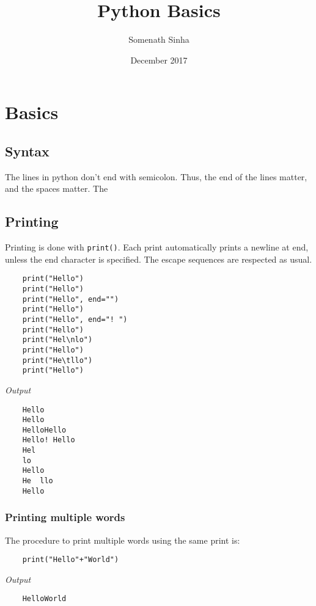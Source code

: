 \documentclass{report}
\title{Python Basics}
\author{Somenath Sinha}
\date{December 2017}
\begin{document}
	\maketitle
	\tableofcontents
	\chapter{Basics}
	\section{Syntax}
	The lines in python don't end with semicolon. Thus, the end of the lines matter, and the spaces matter. The 
	\section{Printing}
	
	Printing is done with \verb|print()|. Each print automatically prints a newline at end, unless the end character is specified. The escape sequences are respected as usual. 
	\vspace{-15pt}
	\begin{verbatim}
	print("Hello")
	print("Hello")
	print("Hello", end="")
	print("Hello")
	print("Hello", end="! ")
	print("Hello")
	print("Hel\nlo")
	print("Hello")
	print("He\tllo")
	print("Hello")
	\end{verbatim}
	\vspace{-10pt}
	
	\textit{Output}
	\vspace{-15pt}
	\begin{verbatim}
	Hello
	Hello
	HelloHello
	Hello! Hello
	Hel
	lo
	Hello
	He	llo
	Hello
	\end{verbatim}
	\vspace{-10pt}
	
	\subsection{Printing multiple words}
	The procedure to print multiple words using the same print is:
	
	\vspace{-15pt}
	\begin{verbatim}
	print("Hello"+"World")
	\end{verbatim}
	\vspace{-10pt}
	
	\textit{Output}
	
	\vspace{-15pt}
	\begin{verbatim}
	HelloWorld
	\end{verbatim}
	\vspace{-10pt}
	
\end{document}
